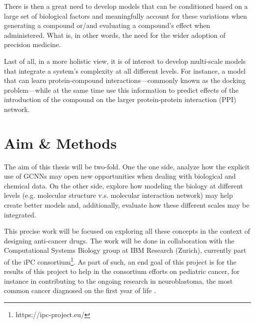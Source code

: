 \documentclass{article}
\begin{document}
There is then a great need to develop models that can be conditioned based on a large
 set of biological factors and meaningfully account for these variations when generating
 a compound or/and evaluating a compound's effect when administered. What is, in other
 words, the need for the wider adoption of precision medicine.

Last of all, in a more holistic view, it is of interest to develop multi-scale models
 that integrate a system's complexity at all different levels. For instance, a model
 that can learn protein-compound interactions---commonly known as the docking
 problem---while at the same time use this information to predict effects of the
 introduction of the compound on the larger protein-protein interaction (PPI)
 network\cite{Sun2019}.

    \section*{Aim \& Methods}

The aim of this thesis will be two-fold. One the one side, analyze how the explicit use
 of GCNNs may open new opportunities when dealing with biological and chemical data. On
 the other side, explore how modeling the biology at different levels (e.g. molecular
 structure v.s. molecular interaction network) may help create better models and,
 additionally, evaluate how these different scales may be integrated.

This precise work will be focused on exploring all these concepts in the context of
 designing anti-cancer drugs. The work will be done in collaboration with the
 Computational Systems Biology group at IBM Research (Zurich), currently part of the iPC
 consortium\footnote{https://ipc-project.eu/}. As part of such, an end goal of this
 project is for the results of this project to help in the consortium efforts on
 pediatric cancer, for instance in contributing to the ongoing research in
 neuroblastoma, the most common cancer diagnosed on the first year of life
 \cite{Maris2010}.
\end{document}
